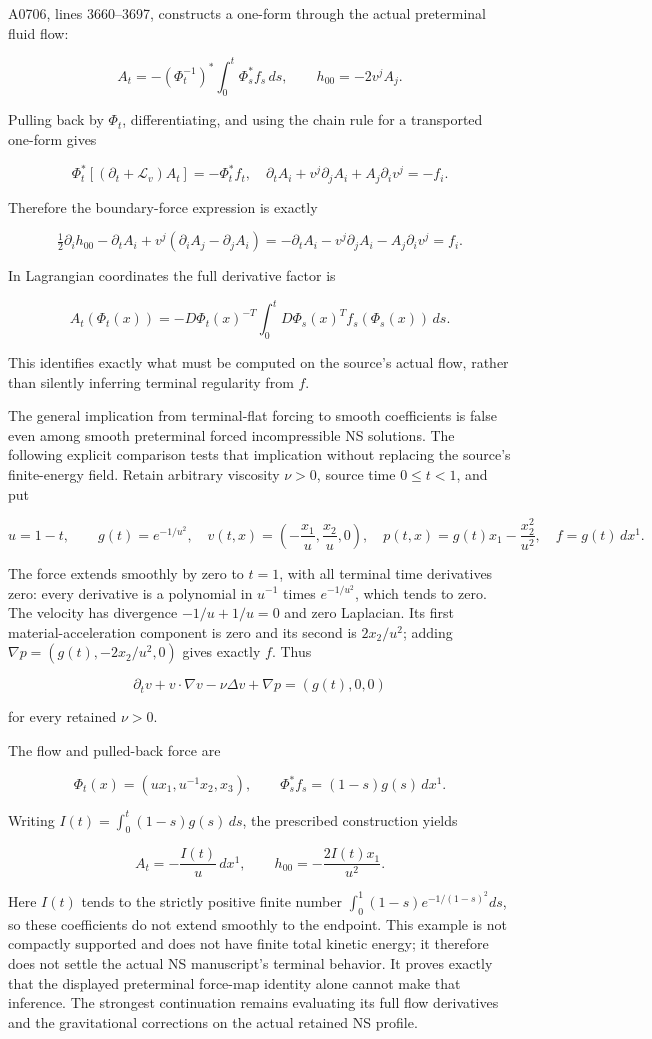 A0706, lines 3660--3697, constructs a one-form through the actual
preterminal fluid flow:

\[
A_t=-(\Phi_t^{-1})^*\int_0^t\Phi_s^*f_s\,ds,
\qquad h_{00}=-2v^jA_j.
\]

Pulling back by \(\Phi_t\), differentiating, and using the chain rule
for a transported one-form gives

\[
\Phi_t^*[(\partial_t+\mathcal L_v)A_t]=-\Phi_t^*f_t,
\quad
\partial_tA_i+v^j\partial_jA_i+A_j\partial_iv^j=-f_i.
\]

Therefore the boundary-force expression is exactly

\[
\tfrac12\partial_i h_{00}-\partial_tA_i
+v^j(\partial_iA_j-\partial_jA_i)
=-\partial_tA_i-v^j\partial_jA_i-A_j\partial_iv^j=f_i.
\]

In Lagrangian coordinates the full derivative factor is

\[
A_t(\Phi_t(x))
=-D\Phi_t(x)^{-T}
\int_0^tD\Phi_s(x)^Tf_s(\Phi_s(x))\,ds.
\]

This identifies exactly what must be computed on the source's actual
flow, rather than silently inferring terminal regularity from \(f\).

The general implication from terminal-flat forcing to smooth
coefficients is false even among smooth preterminal forced
incompressible NS solutions. The following explicit comparison tests
that implication without replacing the source's finite-energy field.
Retain arbitrary viscosity \(\nu>0\), source time \(0\le t<1\), and put

\[
u=1-t,\qquad g(t)=e^{-1/u^2},
\quad v(t,x)=\left(-\frac{x_1}{u},\frac{x_2}{u},0\right),
\quad p(t,x)=g(t)x_1-\frac{x_2^2}{u^2},
\quad f=g(t)\,dx^1.
\]

The force extends smoothly by zero to \(t=1\), with all terminal time
derivatives zero: every derivative is a polynomial in \(u^{-1}\) times
\(e^{-1/u^2}\), which tends to zero. The velocity has divergence
\(-1/u+1/u=0\) and zero Laplacian. Its first material-acceleration
component is zero and its second is \(2x_2/u^2\); adding
\(\nabla p=(g(t),-2x_2/u^2,0)\) gives exactly \(f\). Thus

\[
\partial_tv+v\cdot\nabla v-\nu\Delta v+\nabla p=(g(t),0,0)
\]

for every retained \(\nu>0\).

The flow and pulled-back force are

\[
\Phi_t(x)=(ux_1,u^{-1}x_2,x_3),
\qquad \Phi_s^*f_s=(1-s)g(s)\,dx^1.
\]

Writing \(I(t)=\int_0^t(1-s)g(s)\,ds\), the prescribed construction
yields

\[
A_t=-\frac{I(t)}u\,dx^1,
\qquad h_{00}=-\frac{2I(t)x_1}{u^2}.
\]

Here \(I(t)\) tends to the strictly positive finite number
\(\int_0^1(1-s)e^{-1/(1-s)^2}ds\), so these coefficients do not extend
smoothly to the endpoint. This example is not compactly supported and
does not have finite total kinetic energy; it therefore does not settle
the actual NS manuscript's terminal behavior. It proves exactly that the
displayed preterminal force-map identity alone cannot make that
inference. The strongest continuation remains evaluating its full flow
derivatives and the gravitational corrections on the actual retained NS
profile.
